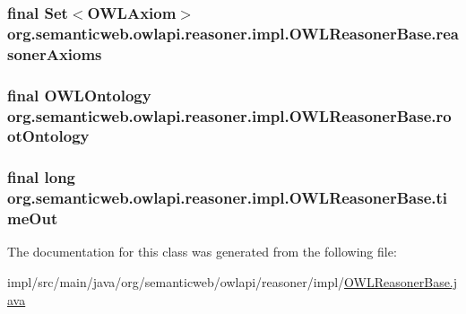 \hypertarget{classorg_1_1semanticweb_1_1owlapi_1_1reasoner_1_1impl_1_1_o_w_l_reasoner_base_a2132aa6fe36530631d9e22949bb753bf}{
\subsubsection[{reasoner\-Axioms}]{\setlength{\rightskip}{0pt plus 5cm}final Set$<${\bf O\-W\-L\-Axiom}$>$ org.\-semanticweb.\-owlapi.\-reasoner.\-impl.\-O\-W\-L\-Reasoner\-Base.\-reasoner\-Axioms\hspace{0.3cm}{\ttfamily [private]}}}\label{classorg_1_1semanticweb_1_1owlapi_1_1reasoner_1_1impl_1_1_o_w_l_reasoner_base_a2132aa6fe36530631d9e22949bb753bf}
\hypertarget{classorg_1_1semanticweb_1_1owlapi_1_1reasoner_1_1impl_1_1_o_w_l_reasoner_base_a7fc931cb266522a2e131763fb69a02c4}{
\subsubsection[{root\-Ontology}]{\setlength{\rightskip}{0pt plus 5cm}final {\bf O\-W\-L\-Ontology} org.\-semanticweb.\-owlapi.\-reasoner.\-impl.\-O\-W\-L\-Reasoner\-Base.\-root\-Ontology\hspace{0.3cm}{\ttfamily [private]}}}\label{classorg_1_1semanticweb_1_1owlapi_1_1reasoner_1_1impl_1_1_o_w_l_reasoner_base_a7fc931cb266522a2e131763fb69a02c4}
\hypertarget{classorg_1_1semanticweb_1_1owlapi_1_1reasoner_1_1impl_1_1_o_w_l_reasoner_base_a158858c0f8f7e4087bdbac071367dd90}{
\subsubsection[{time\-Out}]{\setlength{\rightskip}{0pt plus 5cm}final long org.\-semanticweb.\-owlapi.\-reasoner.\-impl.\-O\-W\-L\-Reasoner\-Base.\-time\-Out\hspace{0.3cm}{\ttfamily [private]}}}\label{classorg_1_1semanticweb_1_1owlapi_1_1reasoner_1_1impl_1_1_o_w_l_reasoner_base_a158858c0f8f7e4087bdbac071367dd90}


The documentation for this class was generated from the following file\-:\begin{DoxyCompactItemize}
\item 
impl/src/main/java/org/semanticweb/owlapi/reasoner/impl/\hyperlink{_o_w_l_reasoner_base_8java}{O\-W\-L\-Reasoner\-Base.\-java}\end{DoxyCompactItemize}
